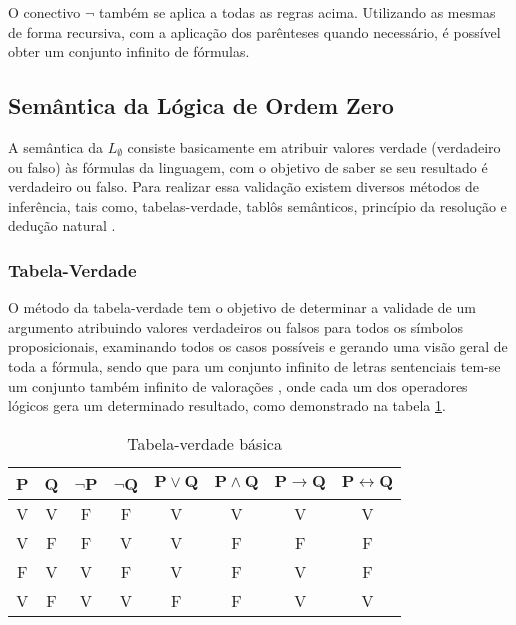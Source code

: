 O conectivo $\neg$ também se aplica a todas as regras acima. Utilizando as mesmas de forma recursiva, com a aplicação dos parênteses quando necessário, é possível obter um conjunto infinito de fórmulas.

\subsection{Semântica da Lógica de Ordem Zero}

A semântica da $L_\emptyset$ consiste basicamente em atribuir valores verdade (verdadeiro ou falso) às fórmulas da linguagem, com o objetivo de saber se seu resultado é verdadeiro ou falso. Para realizar essa validação existem diversos métodos de inferência, tais como, tabelas-verdade, tablôs semânticos, princípio da resolução e dedução natural \cite{flavio2010}.

\subsubsection{Tabela-Verdade}

O método da tabela-verdade tem o objetivo de determinar a validade de um argumento atribuindo valores verdadeiros ou falsos para todos os símbolos proposicionais, examinando todos os casos possíveis e gerando uma visão geral de toda a fórmula, sendo que para um conjunto infinito de letras sentenciais tem-se um conjunto também infinito de valorações \cite{mortari2001}, onde cada um dos operadores lógicos gera um determinado resultado, como demonstrado na tabela \ref{tab:basic-values}.

\begin{table}[!htb]
\centering
\caption[Tabela-verdade básica]{Tabela-verdade básica}
\label{tab:basic-values}
\begin{tabular}{c|c|c|c|c|c|c|c}
\hline
\textbf{P} & \textbf{Q} & \textbf{$\neg$P} & \textbf{$\neg$Q} & \textbf{$\mathbf{P \lor Q}$} & \textbf{$\mathbf{P \land Q}$} & \textbf{$\mathbf{P \rightarrow Q}$} & \textbf{$\mathbf{P \leftrightarrow Q}$} \\ \hline
V          & V          & F                & F                & V            & V                             & V                          & V                                     \\ \hline
V          & F          & F                & V                & V            & F                             & F                          & F                                     \\ \hline
F          & V          & V                & F                & V            & F                             & V                          & F                                     \\ \hline
V          & F          & V                & V                & F            & F                             & V                          & V                                     \\ \hline
\end{tabular}
\end{table}

